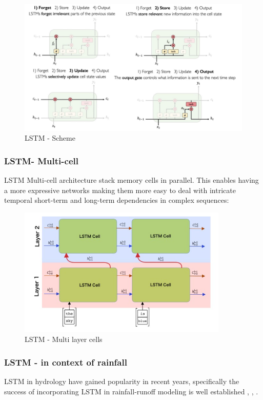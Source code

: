 \documentclass[12pt]{report}
\begin{document}
\begin{figure}[H]\centering\includegraphics[width=14cm]{LSTM_SCHEME.jpeg}\caption{LSTM - Scheme}\end{figure}




\subsubsection{LSTM- Multi-cell}

LSTM Multi-cell architecture stack memory cells in parallel. This enables  having a more expressive networks making them more easy to deal with intricate temporal short-term and long-term dependencies in complex sequences:
\begin{figure}[H]\centering\includegraphics[width=10cm]{LSTM_MULTI.png}\caption{LSTM - Multi layer cells}\end{figure}

\subsubsection{LSTM - in context of rainfall}

LSTM in hydrology have gained popularity in recent years, specifically the success of incorporating LSTM in rainfall-runoff modeling is well established \cite{kratzert2018rainfall}, \cite{kratzert2019toward1},\cite{kratzert2019towards2}  \cite{gauch2021rainfall}.
\end{document}
